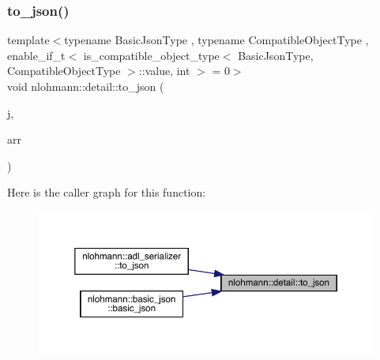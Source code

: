 \subsubsection{\texorpdfstring{to\_json()}{to\_json()}\hspace{0.1cm}{\footnotesize\ttfamily [8/8]}}
{\footnotesize\ttfamily template$<$typename Basic\+Json\+Type , typename Compatible\+Object\+Type , enable\+\_\+if\+\_\+t$<$ is\+\_\+compatible\+\_\+object\+\_\+type$<$ Basic\+Json\+Type, Compatible\+Object\+Type $>$\+::value, int $>$  = 0$>$ \\
void nlohmann\+::detail\+::to\+\_\+json (\begin{DoxyParamCaption}\item[{Basic\+Json\+Type \&}]{j,  }\item[{const Compatible\+Object\+Type \&}]{arr }\end{DoxyParamCaption})}

Here is the caller graph for this function\+:
\nopagebreak
\begin{figure}[H]
\begin{center}
\leavevmode
\includegraphics[width=350pt]{namespacenlohmann_1_1detail_a6fa2f784014bfc0b62d7a35d51e676c9_icgraph}
\end{center}
\end{figure}

